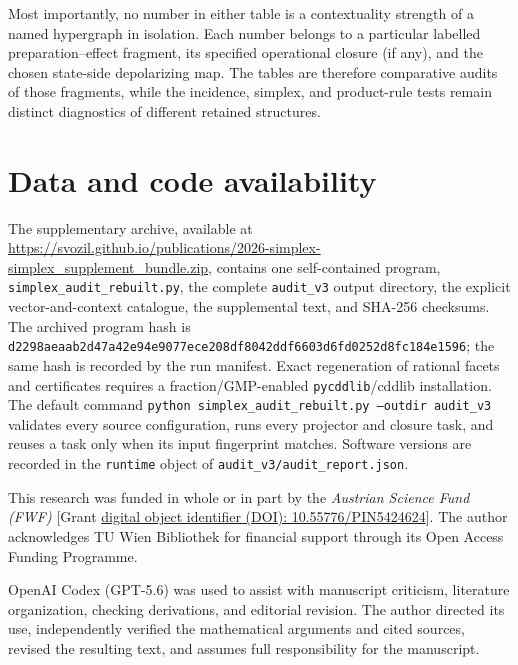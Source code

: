 \documentclass[aps,pra,twocolumn,superscriptaddress,nofootinbib]{revtex4-2}
\begin{document}
Most importantly, no number in either table is a contextuality strength of a
named hypergraph in isolation.  Each number belongs to a particular labelled
preparation--effect fragment, its specified operational closure (if any), and
the chosen state-side depolarizing map.  The tables are therefore comparative
audits of those fragments, while the incidence, simplex, and product-rule tests
remain distinct diagnostics of different retained structures.

\section*{Data and code availability}

The supplementary archive, available at \url{https://svozil.github.io/publications/2026-simplex-simplex_supplement_bundle.zip}, contains one self-contained program,
\texttt{simplex\_audit\_rebuilt.py}, the complete \texttt{audit\_v3} output
directory, the explicit vector-and-context catalogue, the supplemental text,
and SHA-256 checksums.  The archived program hash is
\nolinkurl{d2298aeaab2d47a42e94e9077ece208df8042ddf6603d6fd0252d8fc184e1596};
the same hash is recorded by the run manifest.  Exact regeneration of rational
facets and certificates requires a fraction/GMP-enabled
\texttt{pycddlib}/cddlib installation.  The default command
\texttt{python simplex\_audit\_rebuilt.py --outdir audit\_v3} validates every
source configuration, runs every projector and closure task, and reuses a task
only when its input fingerprint matches.  Software versions are recorded in
the \texttt{runtime} object of \texttt{audit\_v3/audit\_report.json}.

\begin{acknowledgments}
This research was funded in whole or in part by the \textit{Austrian Science Fund (FWF)} [Grant \href{https://doi.org/10.55776/PIN5424624}{digital object identifier (DOI): 10.55776/PIN5424624}].
The author acknowledges TU Wien Bibliothek for financial support through its Open Access Funding Programme.


OpenAI Codex (GPT-5.6) was used to assist with manuscript criticism, literature
organization, checking derivations, and editorial revision.  The author
directed its use, independently verified the mathematical arguments and cited
sources, revised the resulting text, and assumes full responsibility for the
manuscript.
\end{acknowledgments}


\appendix
\end{document}
